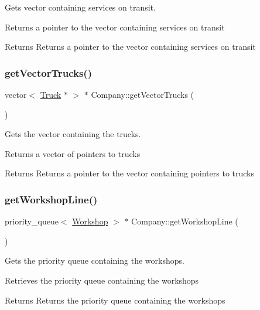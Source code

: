 Gets vector containing services on transit. 

Returns a pointer to the vector containing services on transit

\begin{DoxyReturn}{Returns}
Returns a pointer to the vector containing services on transit 
\end{DoxyReturn}
\mbox{\label{class_company_a78feb735977ce59f253a30082dbf24b6}} 
\subsubsection{\texorpdfstring{get\+Vector\+Trucks()}{getVectorTrucks()}}
{\footnotesize\ttfamily vector$<$ \hyperlink{class_truck}{Truck} $\ast$ $>$ $\ast$ Company\+::get\+Vector\+Trucks (\begin{DoxyParamCaption}{ }\end{DoxyParamCaption})}



Gets the vector containing the trucks. 

Returns a vector of pointers to trucks

\begin{DoxyReturn}{Returns}
Returns a pointer to the vector containing pointers to trucks 
\end{DoxyReturn}
\mbox{\label{class_company_a339f3025b003f464ffd058d5dbdf43e2}} 
\subsubsection{\texorpdfstring{get\+Workshop\+Line()}{getWorkshopLine()}}
{\footnotesize\ttfamily priority\+\_\+queue$<$ \hyperlink{class_workshop}{Workshop} $>$ $\ast$ Company\+::get\+Workshop\+Line (\begin{DoxyParamCaption}{ }\end{DoxyParamCaption})}



Gets the priority queue containing the workshops. 

Retrieves the priority queue containing the workshops

\begin{DoxyReturn}{Returns}
Returns the priority queue containing the workshops 
\end{DoxyReturn}
\mbox{\label{class_company_a1e471fb69b7924e03cfdc01c3692f26c}} 
